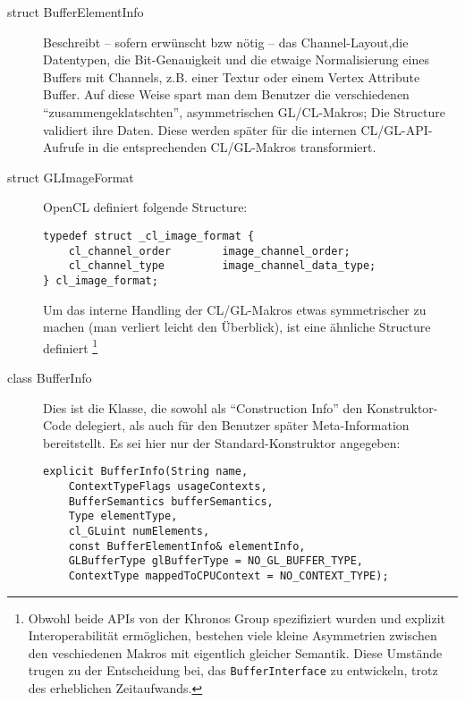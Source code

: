 \begin{description}
		\item[struct BufferElementInfo] 
		Beschreibt -- sofern erwünscht bzw nötig -- das Channel-Layout,die Datentypen, die Bit-Genauigkeit
		und die etwaige Normalisierung eines Buffers mit Channels, 
		z.B. einer Textur oder einem Vertex Attribute Buffer.
		Auf diese Weise spart man dem Benutzer die verschiedenen "`zusammengeklatschten"', asymmetrischen GL/CL-Makros;
		Die Structure validiert ihre Daten. Diese werden später für die internen CL/GL-API-Aufrufe in die
		entsprechenden CL/GL-Makros transformiert.
		
		\item[struct GLImageFormat]
		OpenCL definiert folgende Structure:
		
		\begin{lstlisting}		
typedef struct _cl_image_format {
    cl_channel_order        image_channel_order;
    cl_channel_type         image_channel_data_type;
} cl_image_format;	
		\end{lstlisting}
		
		Um das interne Handling der CL/GL-Makros etwas symmetrischer zu machen (man verliert leicht den Überblick),
		ist eine ähnliche Structure definiert 
		\footnote{Obwohl beide APIs von der Khronos Group spezifiziert wurden und explizit 	
			Interoperabilität ermöglichen, bestehen viele kleine Asymmetrien zwischen den veschiedenen Makros mit
			eigentlich gleicher Semantik. Diese Umstände trugen zu der Entscheidung bei, 
			das \lstinline|BufferInterface| zu entwickeln, trotz des erheblichen Zeitaufwands.}
		
		
		\item[class BufferInfo]
		Dies ist die Klasse, die sowohl als "`Construction Info"' den Konstruktor-Code delegiert, als auch für 
		den Benutzer später Meta-Information bereitstellt.
		Es sei hier nur der Standard-Konstruktor angegeben:
		
		\begin{lstlisting}	
explicit BufferInfo(String name,
	ContextTypeFlags usageContexts,
	BufferSemantics bufferSemantics,
	Type elementType,
	cl_GLuint numElements,
	const BufferElementInfo& elementInfo,
	GLBufferType glBufferType = NO_GL_BUFFER_TYPE,
	ContextType mappedToCPUContext = NO_CONTEXT_TYPE);
		\end{lstlisting}
		

\end{description}
